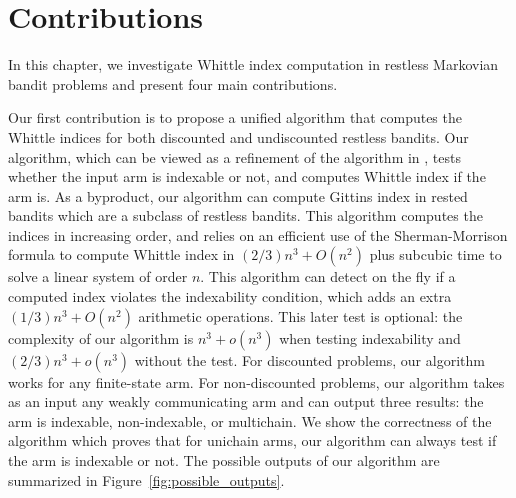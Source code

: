 \section{Contributions}

In this chapter, we investigate Whittle index computation in restless Markovian bandit problems and present four main contributions. 


Our first contribution is to propose a unified algorithm that computes the Whittle indices for both discounted and undiscounted restless bandits. Our algorithm, which can be viewed as a refinement of the algorithm in \cite{akbarzadeh2020conditions}, tests whether the input arm is indexable or not, and computes Whittle index if the arm is. As a byproduct, our algorithm can compute Gittins index in rested bandits which are a subclass of restless bandits.  This algorithm computes the indices in increasing order, and relies on an efficient use of the Sherman-Morrison formula to compute Whittle index in $(2/3)n^3 + O(n^2)$ plus subcubic time \cite{strassen1969gaussian} to solve a linear system of order $n$.
This algorithm can detect on the fly if a computed index violates the indexability condition, which adds an extra $(1/3)n^3+O(n^2)$ arithmetic operations. This later test is optional: the complexity of our algorithm is $n^3+o(n^3)$ when testing indexability and $(2/3)n^3 +o(n^3)$ without the test. For discounted problems, our algorithm works for any finite-state arm.  For non-discounted problems, our algorithm takes as an input any weakly communicating arm and can output three results: the arm is indexable, non-indexable, or multichain. %
We show the correctness of the algorithm which proves that for unichain arms, our algorithm can always test if the arm is indexable or not. The possible outputs of our algorithm are summarized in Figure~\ref{fig:possible_outputs}.

